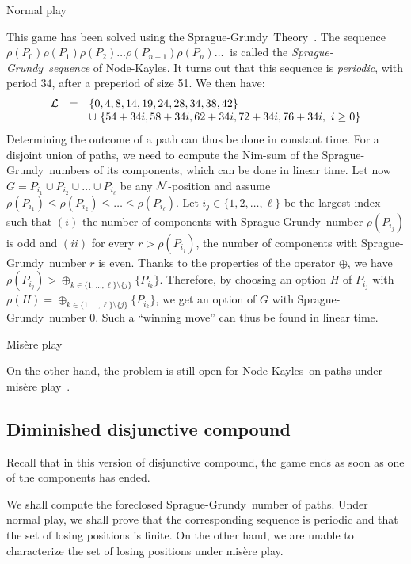 \documentclass[11pt]{article}
\newcommand{\NK}{Node-Kayles}
\newcommand{\SP}{Sprague-Grundy}
\newcommand{\nimsum}{\oplus}
\newcommand{\NN}{{\cal N}}
\newcommand{\LL}{{\cal L}}
\begin{document}
\begin{center}{\sc Normal play}\end{center}
This game has been solved using the \SP\ Theory~\cite[Chapter 4]{WW}.
The sequence $\rho(P_0)\rho(P_1)\rho(P_2)\ldots\rho(P_{n-1})\rho(P_n)\ldots\ $
is called the {\em \SP\ sequence} of \NK.
It turns out that this sequence is {\em periodic},
with period 34, after a preperiod of size 51.
We then have:
$$\begin{array}{rcl}
\LL & = & \{0,4,8,14,19,24,28,34,38,42\}\\
     & & \cup\ \{54+34i,58+34i,62+34i,72+34i,76+34i,\ i\ge 0\}
     \end{array}
     $$
Determining the outcome of a path can thus be done in constant time.
For a disjoint union of paths, we need to compute the Nim-sum of the
\SP\ numbers of its components, which can be done in linear time.
Let now $G=P_{i_1}\cup P_{i_2}\cup\dots\cup P_{i_\ell}$ be any $\NN$-position
and assume $\rho(P_{i_1})\le\rho(P_{i_2})\le\dots\le\rho(P_{i_\ell})$.
Let $i_j\in\{1,2,\dots,\ell\}$ be the largest index such that
$(i)$ the number of components with \SP\ number $\rho(P_{i_j})$ is
odd and $(ii)$ for every $r>\rho(P_{i_j})$,  
the number of components with \SP\ number $r$ is even.
Thanks to the properties of the operator $\nimsum$, we have
$\rho(P_{i_j})>\nimsum_{k\in\{1,\dots,\ell\}\setminus\{j\}}\{P_{i_k}\}$.
Therefore, by choosing an option $H$ of $P_{i_j}$ with
$\rho(H)=\nimsum_{k\in\{1,\dots,\ell\}\setminus\{j\}}\{P_{i_k}\}$,
we get an option of $G$ with \SP\ number 0.
Such a ``winning move'' can thus be found in linear time. 

\vskip 4mm

\begin{center}{\sc Mis\`ere play}\end{center}

On the other hand, the problem is still open for \NK\ on
paths under mis\`ere play~\cite[Chapter 13]{WW}.


\subsection{Diminished disjunctive compound}
\label{ss:dimdis}

Recall that in this version of disjunctive compound, the game ends as soon
as one of the components has ended.

We shall compute the foreclosed \SP\ number of paths.
Under normal play, we shall prove that the corresponding sequence
is periodic and that the set of losing positions is finite.
On the other hand, we are unable to characterize the set of losing
positions under mis\`ere play.
\end{document}
